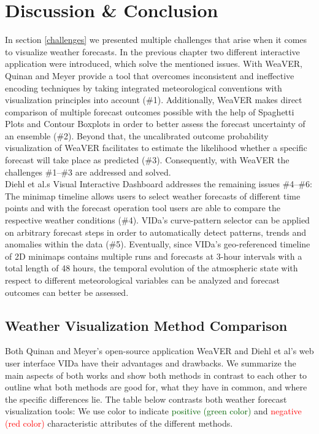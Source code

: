 \documentclass[citeauthoryear]{llncs}
\begin{document}
\section{Discussion \& Conclusion}
In section \ref{challenges} we presented multiple challenges that arise when it comes to visualize weather forecasts. In the previous chapter two different interactive application were introduced, which solve the mentioned issues. With WeaVER, Quinan and Meyer provide a tool that overcomes inconsistent and ineffective encoding techniques by taking integrated meteorological conventions with visualization principles into account (\#1). Additionally, WeaVER makes direct comparison of multiple forecast outcomes possible with the help of Spaghetti Plots and Contour Boxplots in order to better assess the forecast uncertainty of an ensemble (\#2). Beyond that, the uncalibrated outcome probability visualization of WeaVER facilitates to estimate the likelihood whether a specific forecast will take place as predicted (\#3). Consequently, with WeaVER the challenges \#1--\#3 are addressed and solved. \\
Diehl et al.s Visual Interactive Dashboard addresses the remaining issues \#4--\#6: The minimap timeline allows users to select weather forecasts of different time points and with the forecast operation tool users are able to compare the respective weather conditions (\#4). VIDa's curve-pattern selector can be applied on arbitrary forecast steps in order to automatically detect patterns, trends and anomalies within the data (\#5). Eventually, since VIDa's geo-referenced timeline of 2D minimaps contains multiple runs and forecasts at 3-hour intervals with a total length of 48 hours, the temporal evolution of the atmospheric state with respect to different meteorological variables can be analyzed and forecast outcomes can better be assessed.
\subsection{Weather Visualization Method Comparison}
Both Quinan and Meyer's open-source application WeaVER and Diehl et al's web user interface VIDa have their advantages and drawbacks. We summarize the main aspects of both works and show both methods in contrast to each other to outline what both methods are good for, what they have in common, and where the specific differences lie. 
The table below contrasts both weather forecast visualization tools: We use color to indicate \textcolor{darkgreen}{positive (green color)} and \textcolor{red}{negative (red color)} characteristic attributes of the different methods.
\vspace*{0.3cm}
\end{document}
